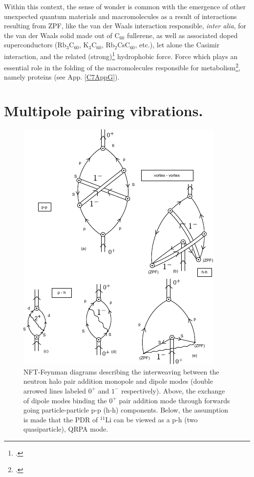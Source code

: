 \begin{subappendices}
 Within this context, the sense of wonder is common with the emergence of other unexpected quantum materials and macromolecules as a result of interactions resulting from ZPF, like the van der Waals interaction responsible, \textit{inter alia}, for the van der Waals solid made out of C$_{60}$ fullerene, as well as associated doped superconductors (Rb$_3$C$_{60}$, K$_3$C$_{60}$, Rb$_2$CsC$_{60}$, etc.), let alone the Casimir interaction, and the related (strong)\footnote{\cite{Chandler:02}.} hydrophobic force. Force which plays an essential role in the folding of the macromolecules responsible for metabolism\footnote{\cite{Dyson:99}.}, namely proteins (see App. \ref{C7AppG}).


\section{Multipole pairing vibrations.}\label{App6G}
\begin{figure}
\includegraphics[width=\textwidth]{C8/figsC8/figA1_corr.pdf}
\caption{ NFT-Feynman diagrams describing the interweaving between the neutron halo pair addition monopole and dipole modes
(double arrowed lines labeled $0^+$ and $1^-$ respectively). Above, the exchange of dipole modes binding the $0^+$ pair addition mode through  forwards going particle-particle p-p (h-h) components. Below,  the assumption is made that the PDR of $^{11}$Li can be viewed as a p-h (two quasiparticle), QRPA mode.}\label{fig6.I.1}
\end{figure}


\end{subappendices}
